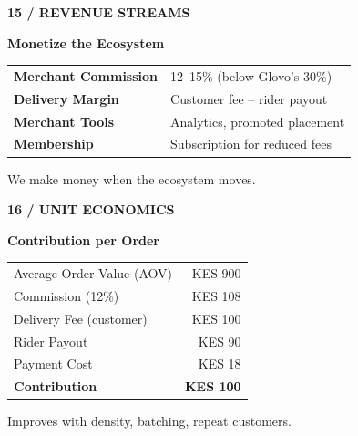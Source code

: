 \documentclass[aspectratio=169,11pt]{beamer}
\begin{document}
\begin{frame}
\textsf{\scriptsize\bfseries\color{LinkBlue}\uppercase{15 / Revenue Streams}}
\vspace{0.2cm}

{\fontsize{22}{28}\sffamily\bfseries\color{CorporateNavy} Monetize the Ecosystem}

\vspace{0.8cm}
\begin{tabularx}{\textwidth}{@{} X X @{}}
    \textsf{\small\bfseries\color{CorporateNavy} Merchant Commission} & \textsf{\small 12–15\% (below Glovo's 30\%)} \\
    \textsf{\small\bfseries\color{CorporateNavy} Delivery Margin} & \textsf{\small Customer fee – rider payout} \\
    \textsf{\small\bfseries\color{CorporateNavy} Merchant Tools} & \textsf{\small Analytics, promoted placement} \\
    \textsf{\small\bfseries\color{CorporateNavy} Membership} & \textsf{\small Subscription for reduced fees}
\end{tabularx}
\vspace{0.4cm}
\textsf{\small We make money when the ecosystem moves.}
\end{frame}

\begin{frame}
\textsf{\scriptsize\bfseries\color{LinkBlue}\uppercase{16 / Unit Economics}}
\vspace{0.2cm}

{\fontsize{22}{28}\sffamily\bfseries\color{CorporateNavy} Contribution per Order}

\vspace{0.8cm}
\begin{tabularx}{\textwidth}{@{} X r @{}}
    \textsf{\small Average Order Value (AOV)} & \textsf{\small KES 900} \\
    \textsf{\small Commission (12\%)} & \textsf{\small KES 108} \\
    \textsf{\small Delivery Fee (customer)} & \textsf{\small KES 100} \\
    \textsf{\small Rider Payout} & \textsf{\small KES 90} \\
    \textsf{\small Payment Cost} & \textsf{\small KES 18} \\
    \hline
    \textsf{\small \textbf{Contribution}} & \textsf{\small \textbf{KES 100}}
\end{tabularx}
\vspace{0.4cm}
\textsf{\small Improves with density, batching, repeat customers.}
\end{frame}
\end{document}
